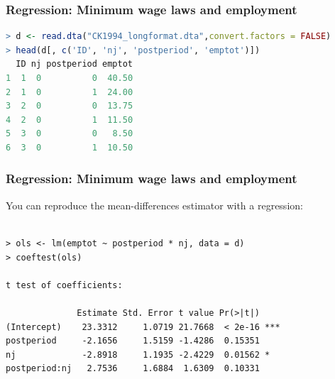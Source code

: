 \documentclass[xcolor=dvipsnames]{beamer}
\begin{document}
\begin{frame}[fragile]
  \frametitle{Regression: Minimum wage laws and employment}

\scriptsize
\begin{lstlisting}[language=R, basicstyle=\ttfamily]
> d <- read.dta("CK1994_longformat.dta",convert.factors = FALSE)
> head(d[, c('ID', 'nj', 'postperiod', 'emptot')])
  ID nj postperiod emptot
1  1  0          0  40.50
2  1  0          1  24.00
3  2  0          0  13.75
4  2  0          1  11.50
5  3  0          0   8.50
6  3  0          1  10.50
\end{lstlisting}
\end{frame}




\begin{frame}[fragile]
  \frametitle{Regression: Minimum wage laws and employment}

You can reproduce the mean-differences estimator with a regression:
\footnotesize
\begin{verbatim}

> ols <- lm(emptot ~ postperiod * nj, data = d)
> coeftest(ols)

t test of coefficients:

              Estimate Std. Error t value Pr(>|t|)    
(Intercept)    23.3312     1.0719 21.7668  < 2e-16 ***
postperiod     -2.1656     1.5159 -1.4286  0.15351    
nj             -2.8918     1.1935 -2.4229  0.01562 *  
postperiod:nj   2.7536     1.6884  1.6309  0.10331
\end{verbatim}
\end{frame}
\end{document}
